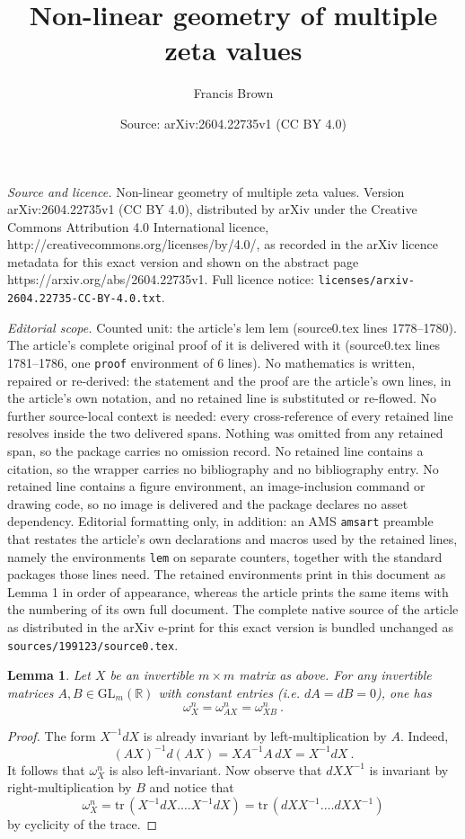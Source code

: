 \documentclass[10pt,a4paper]{amsart}
\title{Non-linear geometry of multiple zeta values}
\author{Francis Brown}
\date{Source: arXiv:2604.22735v1 (CC BY 4.0)}
\newtheorem{lem}{Lemma}
\newcommand{\GL}{\mathrm{GL}}
\newcommand{\RR}{{\mathbb R}}
\newcommand{\tr}{\mathrm{tr}\,}
\begin{document}
\maketitle

\noindent\emph{Source and licence.} Non-linear geometry of multiple zeta values. Version arXiv:2604.22735v1 (CC BY 4.0), distributed by arXiv under the Creative Commons Attribution 4.0 International licence, http://creativecommons.org/licenses/by/4.0/, as recorded in the arXiv licence metadata for this exact version and shown on the abstract page https://arxiv.org/abs/2604.22735v1. Full licence notice: \texttt{licenses/arxiv-2604.22735-CC-BY-4.0.txt}.\par\smallskip

\noindent\textit{Editorial scope.} Counted unit: the article's lem lem (source0.tex lines 1778--1780). The article's complete original proof of it is delivered with it (source0.tex lines 1781--1786, one \texttt{proof} environment of 6 lines). No mathematics is written, repaired or re-derived: the statement and the proof are the article's own lines, in the article's own notation, and no retained line is substituted or re-flowed.  No further source-local context is needed: every cross-reference of every retained line resolves inside the two delivered spans.  Nothing was omitted from any retained span, so the package carries no omission record.  No retained line contains a citation, so the wrapper carries no bibliography and no bibliography entry.  No retained line contains a figure environment, an image-inclusion command or drawing code, so no image is delivered and the package declares no asset dependency.  Editorial formatting only, in addition: an AMS \texttt{amsart} preamble that restates the article's own declarations and macros used by the retained lines, namely the environments \texttt{lem} on separate counters, together with the standard packages those lines need.  The retained environments print in this document as Lemma 1 in order of appearance, whereas the article prints the same items with the numbering of its own full document.  The complete native source of the article as distributed in the arXiv e-print for this exact version is bundled unchanged as \texttt{sources/199123/source0.tex}.
\begin{lem} Let $X$ be an invertible  $m\times m$ matrix as above.  For any invertible matrices $A, B \in \GL_m(\RR)$ with constant entries (i.e. $dA= dB=0$), one has
\[ \omega^n_{X}= \omega^n_{AX} = \omega^n_{XB}\ .\] 
\end{lem} 

\begin{proof} The form $X^{-1} dX$ is already invariant by left-multiplication by $A$. Indeed, 
\[  (AX)^{-1} d(AX) =  X A^{-1} A \, dX = X^{-1} dX\ .\]
It follows that $\omega^n_X$ is also left-invariant. Now observe that  $dX X^{-1}$ is invariant by right-multiplication by $B$ and notice that
\[  \omega^n_X = \tr (X^{-1} dX. \ldots X^{-1} dX) = \tr (  dX X^{-1}. \ldots dX X^{-1})\]
by cyclicity of the trace.  
\end{proof} 
\end{document}
